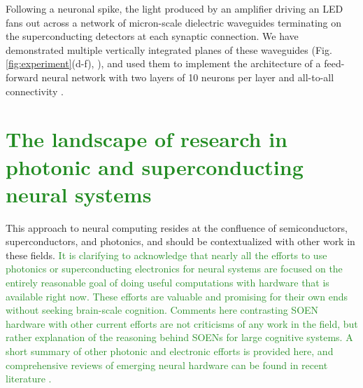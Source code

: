\documentclass[twocolumn]{article}
\begin{document}
Following a neuronal spike, the light produced by an amplifier driving an LED fans out across a network of micron-scale dielectric waveguides terminating on the superconducting detectors at each synaptic connection. We have demonstrated multiple vertically integrated planes of these waveguides (Fig.\,\ref{fig:experiment}(d-f), \cite{chbu2017}), and used them to implement the architecture of a feed-forward neural network with two layers of 10 neurons per layer and all-to-all connectivity \cite{chbu2018}.

\section{\label{sec:other_approaches}\textcolor{ForestGreen}{The landscape of research in photonic and superconducting neural systems}}
This approach to neural computing resides at the confluence of semiconductors, superconductors, and photonics, and should be contextualized with other work in these fields. \textcolor{ForestGreen}{It is clarifying to acknowledge that nearly all the efforts to use photonics or superconducting electronics for neural systems are focused on the entirely reasonable goal of doing useful computations with hardware that is available right now. These efforts are valuable and promising for their own ends without seeking brain-scale cognition. Comments here contrasting SOEN hardware with other current efforts are not criticisms of any work in the field, but rather explanation of the reasoning behind SOENs for large cognitive systems. A short summary of other photonic and electronic efforts is provided here, and comprehensive reviews of emerging neural hardware can be found in recent literature \cite{scpo2017,bexi2020,shta2021}.}
\end{document}
